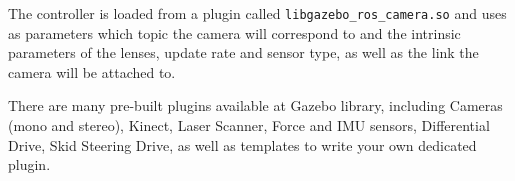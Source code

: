 The controller is loaded from a plugin called \texttt{libgazebo\_ros\_camera.so} and uses as parameters which topic the camera will correspond to and the intrinsic parameters of the lenses, update rate and sensor type, as well as the link the camera will be attached to.

There are many pre-built plugins available at Gazebo library, including Cameras (mono and stereo), Kinect, Laser Scanner, Force and IMU sensors, Differential Drive, Skid Steering Drive, as well as templates to write your own dedicated plugin.






